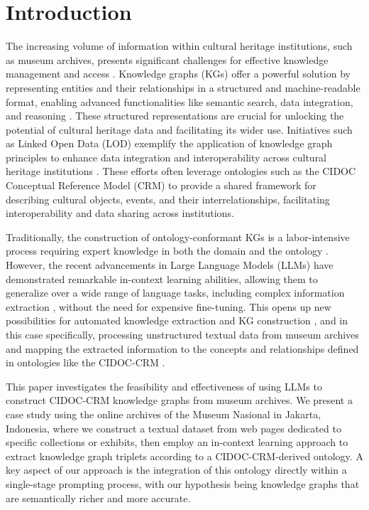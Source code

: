 \documentclass[a4, conference]{IEEEtran}
\begin{document}
\section{Introduction}

The increasing volume of information within cultural heritage institutions, such as museum archives, presents significant challenges for effective knowledge management and access \cite{alexiev2018museum}. Knowledge graphs (KGs) offer a powerful solution by representing entities and their relationships in a structured and machine-readable format, enabling advanced functionalities like semantic search, data integration, and reasoning \cite{hofer2024constructionofknowledge}. These structured representations are crucial for unlocking the potential of cultural heritage data and facilitating its wider use. Initiatives such as Linked Open Data (LOD) exemplify the application of knowledge graph principles to enhance data integration and interoperability across cultural heritage institutions \cite{pedro2013connectingthesmithsonian,dutia2021heritageconnector}. These efforts often leverage ontologies such as the CIDOC Conceptual Reference Model \cite{doerr2005thecidoc} (CRM) to provide a shared framework for describing cultural objects, events, and their interrelationships, facilitating interoperability and data sharing across institutions.

Traditionally, the construction of ontology-conformant KGs is a labor-intensive process requiring expert knowledge in both the domain and the ontology \cite{hofer2024constructionofknowledge}. However, the recent advancements in Large Language Models (LLMs) have demonstrated remarkable in-context learning abilities, allowing them to generalize over a wide range of language tasks, including complex information extraction \cite{remadi2024topromptornottoprompt}, without the need for expensive fine-tuning. This opens up new possibilities for automated knowledge extraction and KG construction \cite{ibrahim2024asurveyonaugmentingknowledgegraphs,zhu2024llmsknowledgegraphconstruction}, and in this case specifically, processing unstructured textual data from museum archives and mapping the extracted information to the concepts and relationships defined in ontologies like the CIDOC-CRM \cite{bruseker2017culturalheritagedatamanagement}.

This paper investigates the feasibility and effectiveness of using LLMs to construct CIDOC-CRM knowledge graphs from museum archives. We present a case study using the online archives of the Museum Nasional in Jakarta, Indonesia, where we construct a textual dataset from web pages dedicated to specific collections or exhibits, then employ an in-context learning approach to extract knowledge graph triplets according to a CIDOC-CRM-derived ontology. A key aspect of our approach is the integration of this ontology directly within a single-stage prompting process, with our hypothesis being knowledge graphs that are semantically richer and more accurate.
\end{document}
